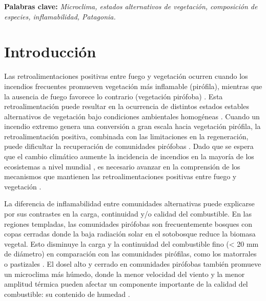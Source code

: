 \noindent \textbf{Palabras clave:} \textit{Microclima, estados alternativos de vegetación, composición de especies, inflamabilidad, Patagonia.}

\section{Introducción}

Las retroalimentaciones positivas entre fuego y vegetación ocurren cuando los incendios frecuentes promueven vegetación más inflamable (pirófila), mientras que la ausencia de fuego favorece lo contrario (vegetación pirófoba) \citep{beckage_fire_2008, pausas_alternative_2020}. Esta retroalimentación puede resultar en la ocurrencia de distintos estados estables alternativos de vegetación bajo condiciones ambientales homogéneas \citep{kitzberger_decreases_2012, tepley_influences_2018,pausas_alternative_2020}. Cuando un incendio extremo genera una conversión a gran escala hacia vegetación pirófila, la retroalimentación positiva, combinada con las limitaciones en la regeneración, puede dificultar la recuperación de comunidades pirófobas  \citep{kitzberger_decreases_2012, kitzberger_firevegetation_2016, tepley_influences_2018}. Dado que se espera que el cambio climático aumente la incidencia de incendios en la mayoría de los ecosistemas a nivel mundial \citep{flannigan_fuel_2016, ellis_global_2022, kitzberger_projections_2022}, es necesario avanzar en la comprensión de los mecanismos que mantienen las retroalimentaciones positivas entre fuego y vegetación \citep{scheffer_alternative_2009, bowman_human_2011, harris_climatevegetationfire_2016, mclauchlan_fire_2020}.

La diferencia de inflamabilidad entre comunidades alternativas puede explicarse por sus contrastes en la carga, continuidad y/o calidad del combustible. En las regiones templadas, las comunidades pirófobas son frecuentemente bosques con copas cerradas donde la baja radiación solar en el sotobosque reduce la biomasa vegetal. Esto disminuye la carga y la continuidad del combustible fino (< 20 mm de diámetro) en comparación con las comunidades pirófilas, como los matorrales o pastizales \citep{lydersen2011effects, paritsis_positive_2015, tiribelli_changes_2018, furlaud_fire_2021}. El dosel alto y cerrado en comunidades pirófobas también promueve un microclima más húmedo, donde la menor velocidad del viento y la menor amplitud térmica pueden afectar un componente importante de la calidad del combustible: su contenido de humedad \citep{little_fire_2012,paritsis_positive_2015,jucker_canopy_2018, de_frenne_global_2019, pausas_alternative_2020, wolf_wildfire_2021}.

